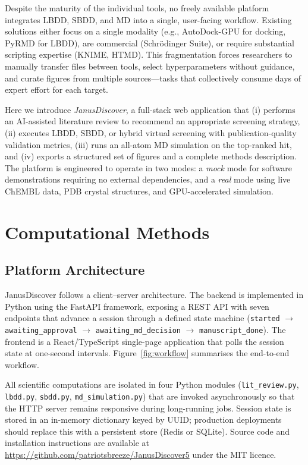 \documentclass[journal=jcisd8,manuscript=article]{achemso}
\begin{document}
Despite the maturity of the individual tools, no freely available platform
integrates LBDD, SBDD, and MD into a single, user-facing workflow.  Existing
solutions either focus on a single modality (e.g., AutoDock-GPU for docking,
PyRMD for LBDD), are commercial (Schr\"{o}dinger Suite), or require
substantial scripting expertise (KNIME, HTMD).\cite{doerr2017htmd}  This fragmentation forces researchers to manually transfer
files between tools, select hyperparameters without guidance, and curate
figures from multiple sources---tasks that collectively consume days of expert
effort for each target.

Here we introduce \textit{JanusDiscover}, a full-stack web application that
(i) performs an AI-assisted literature review to recommend an appropriate
screening strategy, (ii) executes LBDD, SBDD, or hybrid virtual screening
with publication-quality validation metrics, (iii) runs an all-atom MD
simulation on the top-ranked hit, and (iv) exports a structured set of
figures and a complete methods description.  The platform is engineered to
operate in two modes: a \textit{mock} mode for software demonstrations
requiring no external dependencies, and a \textit{real} mode using live
ChEMBL data, PDB crystal structures, and GPU-accelerated simulation.

\section{Computational Methods}

\subsection{Platform Architecture}

JanusDiscover follows a client--server architecture.  The backend is
implemented in Python using the FastAPI framework, exposing a REST API with
seven endpoints that advance a session through a defined state machine
(\texttt{started} $\to$ \texttt{awaiting\_approval} $\to$
\texttt{awaiting\_md\_decision} $\to$ \texttt{manuscript\_done}).  The
frontend is a React/TypeScript single-page application that polls the session
state at one-second intervals.  Figure~\ref{fig:workflow} summarises the
end-to-end workflow.

All scientific computations are isolated in four Python modules
(\texttt{lit\_review.py}, \texttt{lbdd.py}, \texttt{sbdd.py},
\texttt{md\_simulation.py}) that are invoked asynchronously so that the
HTTP server remains responsive during long-running jobs.  Session state is
stored in an in-memory dictionary keyed by UUID; production deployments
should replace this with a persistent store (Redis or SQLite).  Source code
and installation instructions are available at
\url{https://github.com/patriotsbreeze/JanusDiscover5} under the MIT
licence.
\end{document}
